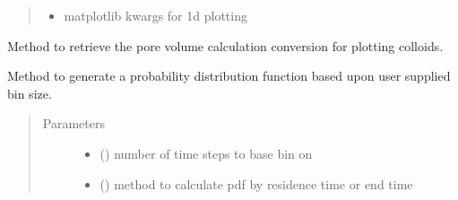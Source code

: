 \documentclass[letterpaper,10pt,english]{sphinxmanual}
\begin{document}
\begin{fulllineitems}
\begin{fulllineitems}
\begin{quote}
\begin{description}
\begin{itemize}
\item {} 
 \textendash{} 
matplotlib kwargs for 1d plotting


\end{itemize}

\end{description}\end{quote}

\end{fulllineitems}


\begin{fulllineitems}
\label{\detokenize{index:lb_colloids.Colloids.Colloid_output.DistributionFunction.pore_volume_conversion}}
Method to retrieve the pore volume calculation
conversion for plotting colloids.

\end{fulllineitems}


\begin{fulllineitems}
\label{\detokenize{index:lb_colloids.Colloids.Colloid_output.DistributionFunction.reset_pdf}}
Method to generate a probability distribution function
based upon user supplied bin size.
\begin{quote}\begin{description}
\item[{Parameters}] \leavevmode\begin{itemize}
\item {} 
 () \textendash{} number of time steps to base bin on

\item {} 
 () \textendash{} method to calculate pdf by residence time or end time

\end{itemize}

\end{description}\end{quote}

\end{fulllineitems}


\end{fulllineitems}
\end{document}
